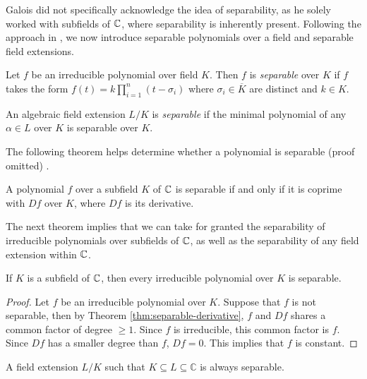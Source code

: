 Galois did not specifically acknowledge the idea of separability, as he solely worked with subfields of $\mathbb C$, where separability is inherently present. Following the approach in \cite[p.~128-129]{Stewart}, we now introduce separable polynomials over a field and separable field extensions.

\begin{definition}
    Let $f$ be an irreducible polynomial over field $K$. Then $f$ is \textit{separable} over $K$ if $f$ takes the form 
    $
        f(t) = k \prod_{i = 1} ^ n(t - \sigma_i)
    $
    where $\sigma_i \in \overline K$ are distinct and $k \in K$.
\end{definition}

\begin{definition}
	An algebraic field extension $L / K$ is \textit{separable} if the minimal polynomial of any $\alpha \in L$ over $K$ is separable over $K$.
\end{definition}

The following theorem helps determine whether a polynomial is separable (proof omitted) \cite[p.~128]{Stewart}. 

\begin{theorem} \label{thm:separable-derivative}
    A polynomial $f$ over a subfield $K$ of  $\mathbb C$ is separable if and only if it is coprime with $Df$ over $K$, where $Df$ is its derivative. 
\end{theorem}

The next theorem implies that we can take for granted the separability of irreducible polynomials over subfields of $\mathbb C$, as well as the separability of any field extension within $\mathbb C$.


\begin{theorem} \label{thm:separable-poly-in-C}
    If $K$ is a subfield of $\mathbb C$, then every irreducible polynomial over $K$ is separable. 
\end{theorem}

\begin{proof}
    Let $f$ be an irreducible polynomial over $K$. Suppose that $f$ is not separable, then by Theorem \ref{thm:separable-derivative}, $f$ and $Df$ shares a common factor of degree $\ge 1$. Since $f$ is irreducible, this common factor is $f$. Since $Df$ has a smaller degree than $f$, $Df = 0$. This implies that $f$ is constant.
\end{proof}


\begin{corollary} \label{thm:separable-extension-in-C}
    A field extension $L/K$ such that $K \subseteq L \subseteq \mathbb C$ is always separable. 
\end{corollary}



